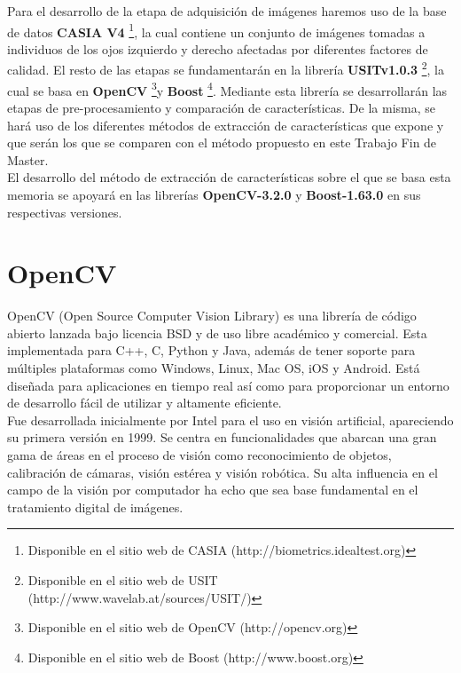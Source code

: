Para el desarrollo de la etapa de adquisición de imágenes haremos uso de la base de datos \textbf{CASIA V4} \footnote{Disponible en el sitio web de CASIA (http://biometrics.idealtest.org)}, la cual contiene un conjunto de imágenes tomadas a individuos de los ojos izquierdo y derecho afectadas por diferentes factores de calidad. El resto de las etapas se fundamentarán en la librería \textbf{USITv1.0.3} \footnote{Disponible en el sitio web de USIT (http://www.wavelab.at/sources/USIT/)}, la cual se basa en \textbf{OpenCV} \footnote{Disponible en el sitio web de OpenCV (http://opencv.org)}y \textbf{Boost} \footnote{Disponible en el sitio web de Boost (http://www.boost.org)}. Mediante esta librería se desarrollarán las etapas de pre-procesamiento y comparación de características. De la misma, se hará uso de los diferentes métodos de extracción de características que expone y que serán los que se comparen con el método propuesto en este Trabajo Fin de Master. \\

El desarrollo del método de extracción de características sobre el que se basa esta memoria se apoyará en las librerías \textbf{OpenCV-3.2.0} y \textbf{Boost-1.63.0} en sus respectivas versiones. \\




\section{OpenCV}

OpenCV (Open Source Computer Vision Library) es una librería de código abierto lanzada bajo licencia BSD y de uso libre académico y comercial. Esta implementada para C++, C, Python y Java, además de tener soporte para múltiples plataformas como Windows, Linux, Mac OS, iOS y Android. Está diseñada para aplicaciones en tiempo real así como para proporcionar un entorno de desarrollo fácil de utilizar y altamente eficiente. \\

Fue desarrollada inicialmente por Intel para el uso en visión artificial, apareciendo su primera versión en 1999. Se centra en funcionalidades que abarcan una gran gama de áreas en el proceso de visión como reconocimiento de objetos, calibración de cámaras, visión estérea y visión robótica. Su alta influencia en el campo de la visión por computador ha echo que sea base fundamental en el tratamiento digital de imágenes. \\

